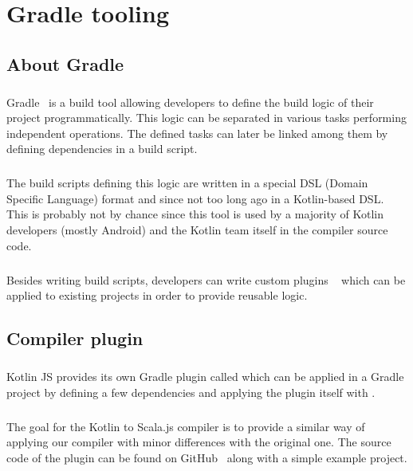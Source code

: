
\chapter{Gradle tooling}
\section{About Gradle}
\paragraph{} Gradle~\cite{gradle} is a build tool allowing developers to define the build logic of 
their project programmatically. This logic can be separated in various tasks performing independent 
operations. The defined tasks can later be linked among them by defining dependencies in a build 
script.

\paragraph{} The build scripts defining this logic are written in a special DSL (Domain Specific 
Language) format and since not too long ago in a Kotlin-based DSL. This is probably not by chance 
since this tool is used by a majority of Kotlin developers (mostly Android) and the Kotlin team 
itself in the compiler source code. 

\paragraph{} Besides writing build scripts, developers can write custom plugins 
~\cite{gradle_plugins} which can be applied to existing projects in order to provide reusable logic.

\section{Compiler plugin}

\paragraph{} Kotlin JS provides its own Gradle plugin called  which can be 
applied in a Gradle project by defining a few dependencies and applying the plugin itself with 
.

\paragraph{} The goal for the Kotlin to Scala.js compiler is to provide a similar way of applying our compiler with minor differences with the original one. The source code of the plugin can be found on GitHub~\cite{kotlin_scalajs_gradle_plugin} along with a simple example project.

